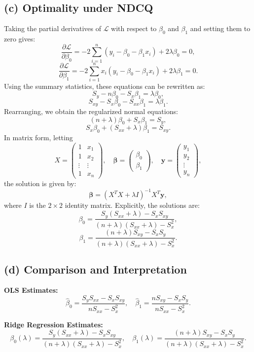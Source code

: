 \documentclass{article}
\begin{document}
\subsection*{(c) Optimality under NDCQ}
Taking the partial derivatives of \(\mathcal{L}\) with respect to \(\beta_0\) and \(\beta_1\) and setting them to zero gives:
\[
\frac{\partial \mathcal{L}}{\partial \beta_0} = -2\sum_{i=1}^n (y_i - \beta_0 - \beta_1 x_i) + 2\lambda \beta_0 = 0,
\]
\[
\frac{\partial \mathcal{L}}{\partial \beta_1} = -2\sum_{i=1}^n x_i (y_i - \beta_0 - \beta_1 x_i) + 2\lambda \beta_1 = 0.
\]
Using the summary statistics, these equations can be rewritten as:
\[
S_y - n\beta_0 - S_x \beta_1 = \lambda \beta_0,
\]
\[
S_{xy} - S_x \beta_0 - S_{xx} \beta_1 = \lambda \beta_1.
\]
Rearranging, we obtain the regularized normal equations:
\[
(n+\lambda)\beta_0 + S_x \beta_1 = S_y,
\]
\[
S_x \beta_0 + (S_{xx}+\lambda)\beta_1 = S_{xy}.
\]
In matrix form, letting
\[
X = \begin{pmatrix} 1 & x_1 \\ 1 & x_2 \\ \vdots & \vdots \\ 1 & x_n \end{pmatrix}, \quad \boldsymbol{\beta} = \begin{pmatrix}\beta_0 \\ \beta_1\end{pmatrix}, \quad \mathbf{y} = \begin{pmatrix} y_1 \\ y_2 \\ \vdots \\ y_n \end{pmatrix},
\]
the solution is given by:
\[
\boxed{\boldsymbol{\beta} = \left( X^T X + \lambda I \right)^{-1} X^T \mathbf{y}},
\]
where \(I\) is the \(2 \times 2\) identity matrix. Explicitly, the solutions are:
\[
\boxed{\beta_0 = \frac{S_y (S_{xx}+\lambda) - S_x S_{xy}}{(n+\lambda)(S_{xx}+\lambda) - S_x^2}},
\]
\[
\boxed{\beta_1 = \frac{(n+\lambda) S_{xy} - S_x S_y}{(n+\lambda)(S_{xx}+\lambda) - S_x^2}}.
\]

\subsection*{(d) Comparison and Interpretation}
\textbf{OLS Estimates:}
\[
\hat{\beta}_0 = \frac{S_y S_{xx} - S_x S_{xy}}{n S_{xx} - S_x^2}, \quad \hat{\beta}_1 = \frac{n S_{xy} - S_x S_y}{n S_{xx} - S_x^2}.
\]

\textbf{Ridge Regression Estimates:}
\[
\beta_0(\lambda) = \frac{S_y (S_{xx}+\lambda) - S_x S_{xy}}{(n+\lambda)(S_{xx}+\lambda) - S_x^2}, \quad \beta_1(\lambda) = \frac{(n+\lambda) S_{xy} - S_x S_y}{(n+\lambda)(S_{xx}+\lambda) - S_x^2}.
\]
\end{document}
